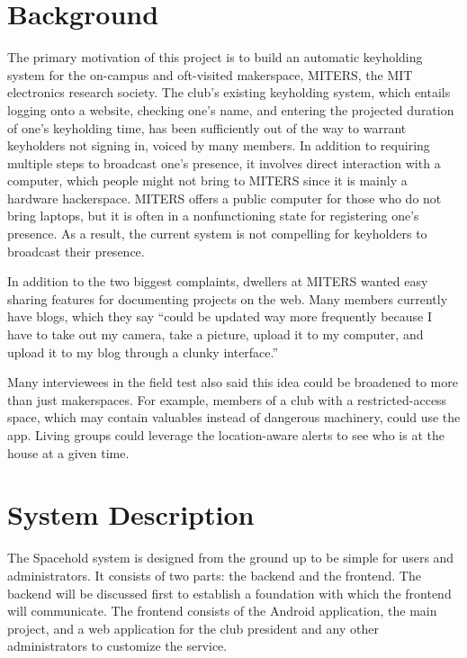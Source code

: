 \documentclass[11pt,twocolumn]{article}
\begin{document}
\section{Background}
The primary motivation of this project is to build an automatic keyholding system for the on-campus and oft-visited makerspace, MITERS, the MIT electronics research society. The club's existing keyholding system, which entails logging onto a website, checking one's name, and entering the projected duration of one's keyholding time, has been sufficiently out of the way to warrant keyholders not signing in, voiced by many members. In addition to requiring multiple steps to broadcast one's presence, it involves direct interaction with a computer, which people might not bring to MITERS since it is mainly a hardware hackerspace. MITERS offers a public computer for those who do not bring laptops, but it is often in a nonfunctioning state for registering one's presence. As a result, the current system is not compelling for keyholders to broadcast their presence.

In addition to the two biggest complaints, dwellers at MITERS wanted easy sharing features for documenting projects on the web. Many members currently have blogs, which they say ``could be updated way more frequently because I have to take out my camera, take a picture, upload it to my computer, and upload it to my blog through a clunky interface.''

Many interviewees in the field test also said this idea could be broadened to more than just makerspaces. For example, members of a club with a restricted-access space, which may contain valuables instead of dangerous machinery, could use the app. Living groups could leverage the location-aware alerts to see who is at the house at a given time. 

\section{System Description}
The Spacehold system is designed from the ground up to be simple for users and administrators. It consists of two parts: the backend and the frontend. The backend will be discussed first to establish a foundation with which the frontend will communicate. The frontend consists of the Android application, the main project, and a web application for the club president and any other administrators to customize the service.
\end{document}
